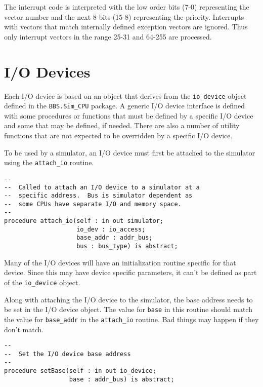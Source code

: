 \documentclass[10pt, openany]{book}
\begin{document}
The interrupt code is interpreted with the low order bits (7-0) representing the vector number and the next 8 bits (15-8) representing the priority.  Interrupts with vectors that match internally defined exception vectors are ignored.  Thus only interrupt vectors in the range 25-31 and 64-255 are processed.

\chapter{I/O Devices}
\label{chap:IODev}
Each I/O device is based on an object that derives from the \verb|io_device| object defined in the \verb|BBS.Sim_CPU| package.  A generic I/O device interface is defined with some procedures or functions that must be defined by a specific I/O device and some that may be defined, if needed.  There are also a number of utility functions that are not expected to be overridden by a specific I/O device.

To be used by a simulator, an I/O device must first be attached to the simulator using the \verb|attach_io| routine.
\begin{lstlisting}
--
--  Called to attach an I/O device to a simulator at a
--  specific address.  Bus is simulator dependent as
--  some CPUs have separate I/O and memory space.
--
procedure attach_io(self : in out simulator;
                    io_dev : io_access;
                    base_addr : addr_bus;
                    bus : bus_type) is abstract;
\end{lstlisting}

Many of the I/O devices will have an initialization routine specific for that device.  Since this may have device specific parameters, it can't be defined as part of the \verb|io_device| object.

Along with attaching the I/O device to the simulator, the base address needs to be set in the I/O device object.  The value for \verb|base| in this routine should match the value for \verb|base_addr| in the \verb|attach_io| routine.  Bad things may happen if they don't match.
\begin{lstlisting}
--
--  Set the I/O device base address
--
procedure setBase(self : in out io_device;
                  base : addr_bus) is abstract;
\end{lstlisting}
\end{document}
